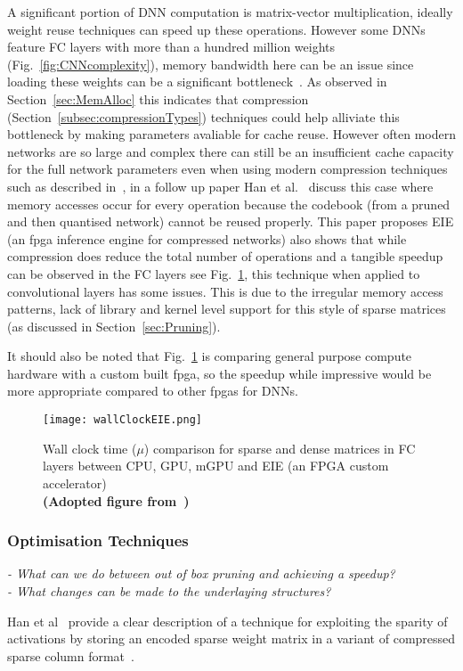\documentclass[../../D1.tex]{subfiles}
\begin{document}
A significant portion of DNN computation is matrix-vector multiplication, ideally weight reuse techniques can speed up these operations.
However some DNNs feature FC layers with more than a hundred million weights (Fig.~\ref{fig:CNNcomplexity}), memory bandwidth here can be an issue since loading these weights can be a significant bottleneck~\autocite{qiuGoingDeeperEmbedded2016}. 
As observed in Section~\ref{sec:MemAlloc} this indicates that compression (Section~\ref{subsec:compressionTypes}) techniques could help alliviate this bottleneck by making parameters avaliable for cache reuse.
However often modern networks are so large and complex there can still be an insufficient cache capacity for the full network parameters even when using modern compression techniques such as described in~\autocite{hanDeepCompressionCompressing2016}, in a follow up paper Han et al.~\autocite{hanEIEEfficientInference2016} discuss this case where memory accesses occur for every operation because the codebook (from a pruned and then quantised network) cannot be reused properly.
This paper proposes EIE (an \acrshort{fpga} inference engine for compressed networks) also shows that while compression does reduce the total number of operations and a tangible speedup can be observed in the FC layers see Fig.~\ref{fig:wallClockEIE}, this technique when applied to convolutional layers has some issues.
This is due to the irregular memory access patterns, lack of library and kernel level support for this style of sparse matrices (as discussed in Section~\ref{sec:Pruning}). 

It should also be noted that Fig.~\ref{fig:wallClockEIE} is comparing general purpose compute hardware with a custom built \acrshort{fpga}, so the speedup while impressive would be more appropriate compared to other \acrshort{fpga}s for DNNs.



\begin{figure}[H]
    \texttt{[image: wallClockEIE.png]} 
    \caption{Wall clock time ($\mu$) comparison for sparse and dense matrices in FC layers between CPU, GPU, mGPU and EIE (an FPGA custom accelerator)\\ \textbf{(Adopted figure from~\autocite{hanEIEEfficientInference2016})}}
    \label{fig:wallClockEIE}   
\end{figure}

\subsubsection{Optimisation Techniques}
\emph{
- What can we do between out of box pruning and achieving a speedup?\\
- What changes can be made to the underlaying structures?
}


 Han et al~\autocite{hanEIEEfficientInference2016} provide a clear description of a technique for exploiting the sparity of activations by storing an encoded sparse weight matrix in a variant of compressed sparse column format~\autocite{vuducAutomaticPerformanceTuning}.
\end{document}
